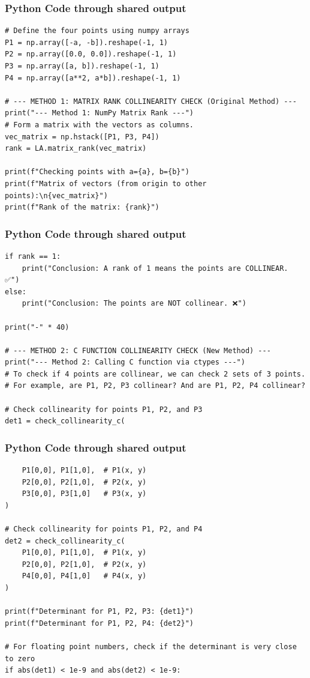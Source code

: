 \documentclass{beamer}
\begin{document}
\begin{frame}[fragile]
\frametitle{Python Code through shared output}
\begin{lstlisting}
# Define the four points using numpy arrays
P1 = np.array([-a, -b]).reshape(-1, 1)
P2 = np.array([0.0, 0.0]).reshape(-1, 1)
P3 = np.array([a, b]).reshape(-1, 1)
P4 = np.array([a**2, a*b]).reshape(-1, 1)

# --- METHOD 1: MATRIX RANK COLLINEARITY CHECK (Original Method) ---
print("--- Method 1: NumPy Matrix Rank ---")
# Form a matrix with the vectors as columns.
vec_matrix = np.hstack([P1, P3, P4])
rank = LA.matrix_rank(vec_matrix)

print(f"Checking points with a={a}, b={b}")
print(f"Matrix of vectors (from origin to other points):\n{vec_matrix}")
print(f"Rank of the matrix: {rank}")
\end{lstlisting}
\end{frame}
\begin{frame}[fragile]
\frametitle{Python Code through shared output}
\begin{lstlisting}
if rank == 1:
    print("Conclusion: A rank of 1 means the points are COLLINEAR. ✅")
else:
    print("Conclusion: The points are NOT collinear. ❌")

print("-" * 40)

# --- METHOD 2: C FUNCTION COLLINEARITY CHECK (New Method) ---
print("--- Method 2: Calling C function via ctypes ---")
# To check if 4 points are collinear, we can check 2 sets of 3 points.
# For example, are P1, P2, P3 collinear? And are P1, P2, P4 collinear?

# Check collinearity for points P1, P2, and P3
det1 = check_collinearity_c(
\end{lstlisting}
\end{frame}
\begin{frame}[fragile]
\frametitle{Python Code through shared output}
\begin{lstlisting}
    P1[0,0], P1[1,0],  # P1(x, y)
    P2[0,0], P2[1,0],  # P2(x, y)
    P3[0,0], P3[1,0]   # P3(x, y)
)

# Check collinearity for points P1, P2, and P4
det2 = check_collinearity_c(
    P1[0,0], P1[1,0],  # P1(x, y)
    P2[0,0], P2[1,0],  # P2(x, y)
    P4[0,0], P4[1,0]   # P4(x, y)
)

print(f"Determinant for P1, P2, P3: {det1}")
print(f"Determinant for P1, P2, P4: {det2}")

# For floating point numbers, check if the determinant is very close to zero
if abs(det1) < 1e-9 and abs(det2) < 1e-9:
\end{lstlisting}
\end{frame}
\end{document}
